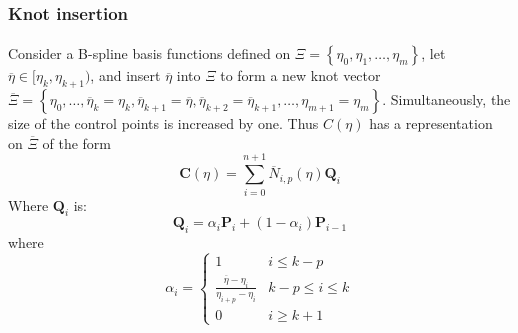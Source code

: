 \subsubsection{Knot insertion}
\label{lr_sec:nurbs_knot_ins}
\paragraph{}
Consider a B-spline basis functions defined on 
$\Xi = \left\{
    \eta_0 ,\eta_1,\dots,\eta_m 
    \right\}$,
let $\overline{\eta} \in [\eta_k ,\eta_{k+1} )$, and insert $\overline{\eta}$ into $\Xi$ to form a new knot vector 
$\overline{\Xi} = \left\{
    \eta_0 ,\dots, \overline{\eta}_k = \eta_k , 
    \overline{\eta}_{k+1} = \overline{\eta}, 
    \overline{\eta}_{k+2} = \overline{\eta}_{k+1} ,
    \dots,\eta_{m+1} = \eta_m
    \right\}$.
Simultaneously, the size of the control points is increased by one. Thus $C(\eta)$ has a representation on $\overline{\Xi}$ of the form
\begin{equation}
    \mathbf{C}(\eta) = \sum_{i=0}^{n+1}
                        \overline{N}_{i,p} (\eta)
                        \mathbf{Q}_i
\end{equation}
Where $\mathbf{Q}_i$ is:
\begin{equation}
    \mathbf{Q}_i = \alpha_i \mathbf{P}_i +
                    (1-\alpha_i) \mathbf{P}_{i-1}
\end{equation}
where
\begin{equation}
    \alpha_i =  \begin{cases}
                    1       & i \leq k-p \\
                    \frac{ \overline{\eta} -\eta_i }{ \eta_{i+p} - \eta_i } & k-p \leq i \leq k \\
                    0 & i \geq k+1                          
                \end{cases}
\end{equation}


